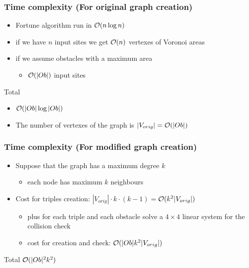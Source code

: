 \begin{frame}
  \frametitle{Time complexity (For original graph creation)}
  \begin{itemize}
  \item \alert{Fortune} algorithm run in \alert{$\mathcal{O}(n\log n)$}\pause
  \item if we have $n$ input sites we get \alert{$\mathcal{O}(n)$} vertexes
    of Voronoi areas\pause
  \item if we assume obstacles with a maximum area\pause
    \begin{itemize}
    \item \alert{$\mathcal{O}(|Ob|)$} input sites\pause
    \end{itemize}
  \end{itemize}
  \begin{block}{Total}
    \begin{itemize}
    \item \alert{$\mathcal{O}(|Ob|\log |Ob|)$}\pause
    \item The number of vertexes of the graph is \alert{$|V_{orig}|=\mathcal{O}(|Ob|)$}
    \end{itemize}
  \end{block}
\end{frame}

\begin{frame}
  \frametitle{Time complexity (For modified graph creation)}
  \begin{itemize}
  \item Suppose that the graph has a maximum degree \alert{$k$}\pause
    \begin{itemize}
    \item each node has maximum $k$ \alert{neighbours}\pause
    \end{itemize}
  \item Cost for triples \alert{creation}: $|V_{orig}|\cdot k\cdot
    (k-1)=$\alert{$\mathcal{O}(k^2|V_{orig}|)$}\pause
    \begin{itemize}
    \item plus for each triple and each obstacle solve a $4\times 4$
      linear system for the collision check\pause
    \item cost for creation and check: \alert{$\mathcal{O}(|Ob|k^2|V_{orig}|)$}\pause
    \end{itemize}
  \end{itemize}
  \begin{block}{Total}
    \alert{$\mathcal{O}(|Ob|^2k^2)$}
  \end{block}
\end{frame}

